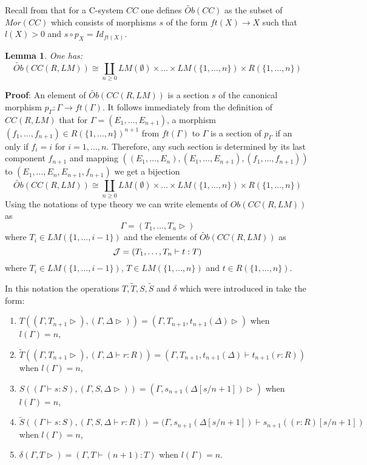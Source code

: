 \documentclass[11pt]{article}
\newenvironment{eq}{\begin{equation}}{\end{equation}}
\newenvironment{proof}{{\bf Proof}:}{\vskip 5mm }
\newtheorem{lemma}[proposition]{Lemma}
\newcommand{\llabel}[1]{\label{#1}}
\newcommand{\sr}{\rightarrow}
\newcommand{\wt}{\widetilde}
\begin{document}
Recall from \cite{Csubsystems} that for a C-system $CC$ one defines $\wt{Ob}(CC)$ as the subset of $Mor(CC)$ which consists of morphisms $s$ of the form $ft(X)\sr X$ such that $l(X)>0$ and $s\circ p_X=Id_{ft(X)}$. 
%
\begin{lemma}
\llabel{2014.06.30.l2}
One has:
%
$$\wt{Ob}(CC(R,LM))\cong \coprod_{n\ge 0} LM(\emptyset)\times\dots\times LM(\{1,\dots,n\})\times R(\{1,\dots,n\})$$
\end{lemma}
%
\begin{proof}
An element of $\wt{Ob}(CC(R,LM))$ is a section $s$ of the canonical morphism $p_{\Gamma}:\Gamma\sr ft(\Gamma)$. It follows immediately from the definition of $CC(R,LM)$ that for $\Gamma=(E_1,\dots,E_{n+1})$, a morphism $(f_1,\dots,f_{n+1})\in R(\{1,\dots,n\})^{n+1}$ from $ft(\Gamma)$ to $\Gamma$ is a section of $p_{\Gamma}$ if an only if $f_i=i$ for $i=1,\dots,n$. Therefore, any such section is determined by its last component $f_{n+1}$ and mapping
$((E_1,\dots,E_n), (E_1,\dots,E_{n+1}), (f_1,\dots,f_{n+1}))$ to $(E_1,\dots,E_n,E_{n+1},f_{n+1})$ we get a bijection
%
\begin{eq}
\llabel{2009.10.15.eq2}
\wt{Ob}(CC(R,LM))\cong \coprod_{n\ge 0} LM(\emptyset)\times\dots\times LM(\{1,\dots,n\})\times R(\{1,\dots,n\})
\end{eq}
%
\end{proof}
%
Using the notations of type theory we can write elements of $Ob(CC(R,LM))$ as 
%
$$\Gamma=(T_1,\dots,T_n\rhd)$$
%
where $T_i\in LM(\{1,\dots,i-1\})$ and the elements of $\wt{Ob}(CC(R,LM))$ as 
%
$${\cal J} = (T_1,\dots,T_n\vdash t:T)$$
%
where $T_i\in LM(\{1,\dots,i-1\})$, $T\in LM(\{1,\dots,n\})$ and $t\in R(\{1,\dots,n\})$.

In this notation the operations $T,\wt{T},S,\wt{S}$ and $\delta$ which were introduced in \cite{Csubsystems} take the form:
%
\begin{enumerate}
\item $T((\Gamma,T_{n+1}\rhd),(\Gamma,\Delta\rhd))=(\Gamma,T_{n+1},t_{n+1}(\Delta)\rhd)$ when $l(\Gamma)=n$,
\item $\wt{T}((\Gamma,T_{n+1}\rhd),(\Gamma,\Delta\vdash r:R))=(\Gamma,T_{n+1},t_{n+1}(\Delta)\vdash t_{n+1}(r:R))$ when $l(\Gamma)=n$,
\item $S((\Gamma\vdash s:S),(\Gamma,S,\Delta\rhd))=(\Gamma,s_{n+1}(\Delta[s/n+1])\rhd)$ when $l(\Gamma)=n$,
\item $\wt{S}((\Gamma\vdash s:S),(\Gamma,S,\Delta\vdash r:R))=(\Gamma,s_{n+1}(\Delta[s/n+1])\vdash s_{n+1}((r:R)[s/n+1])$ when $l(\Gamma)=n$,
\item $\delta(\Gamma,T\rhd)=(\Gamma,T\vdash (n+1):T)$ when $l(\Gamma)=n$.
\end{enumerate}
%
\end{document}
